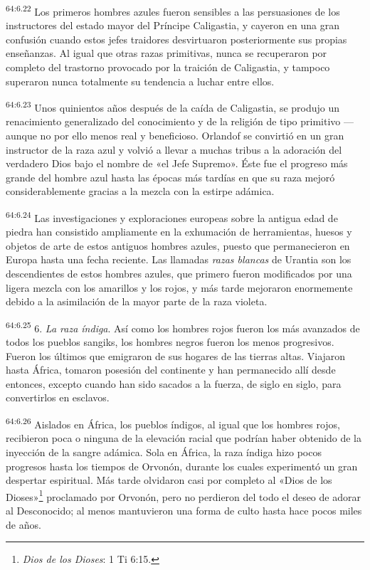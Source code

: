 \par
\textsuperscript{64:6.22} Los primeros hombres azules fueron sensibles a las persuasiones de los instructores del estado mayor del Príncipe Caligastia, y cayeron en una gran confusión cuando estos jefes traidores desvirtuaron posteriormente sus propias enseñanzas. Al igual que otras razas primitivas, nunca se recuperaron por completo del trastorno provocado por la traición de Caligastia, y tampoco superaron nunca totalmente su tendencia a luchar entre ellos.

\par
\textsuperscript{64:6.23} Unos quinientos años después de la caída de Caligastia, se produjo un renacimiento generalizado del conocimiento y de la religión de tipo primitivo ---aunque no por ello menos real y beneficioso. Orlandof se convirtió en un gran instructor de la raza azul y volvió a llevar a muchas tribus a la adoración del verdadero Dios bajo el nombre de «el Jefe Supremo». Éste fue el progreso más grande del hombre azul hasta las épocas más tardías en que su raza mejoró considerablemente gracias a la mezcla con la estirpe adámica.

\par
\textsuperscript{64:6.24} Las investigaciones y exploraciones europeas sobre la antigua edad de piedra han consistido ampliamente en la exhumación de herramientas, huesos y objetos de arte de estos antiguos hombres azules, puesto que permanecieron en Europa hasta una fecha reciente. Las llamadas \textit{razas blancas} de Urantia son los descendientes de estos hombres azules, que primero fueron modificados por una ligera mezcla con los amarillos y los rojos, y más tarde mejoraron enormemente debido a la asimilación de la mayor parte de la raza violeta.

\par
\textsuperscript{64:6.25} 6. \textit{La raza índiga}. Así como los hombres rojos fueron los más avanzados de todos los pueblos sangiks, los hombres negros fueron los menos progresivos. Fueron los últimos que emigraron de sus hogares de las tierras altas. Viajaron hasta África, tomaron posesión del continente y han permanecido allí desde entonces, excepto cuando han sido sacados a la fuerza, de siglo en siglo, para convertirlos en esclavos.

\par
\textsuperscript{64:6.26} Aislados en África, los pueblos índigos, al igual que los hombres rojos, recibieron poca o ninguna de la elevación racial que podrían haber obtenido de la inyección de la sangre adámica. Sola en África, la raza índiga hizo pocos progresos hasta los tiempos de Orvonón, durante los cuales experimentó un gran despertar espiritual. Más tarde olvidaron casi por completo al «Dios de los Dioses»\footnote{\textit{Dios de los Dioses}: 1 Ti 6:15.} proclamado por Orvonón, pero no perdieron del todo el deseo de adorar al Desconocido; al menos mantuvieron una forma de culto hasta hace pocos miles de años.

